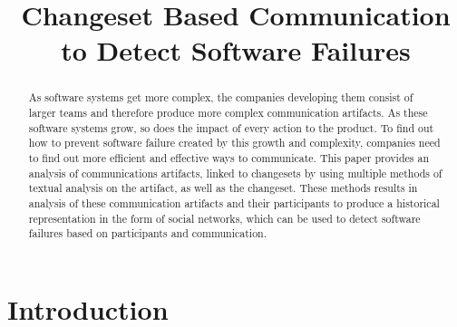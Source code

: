 \documentclass[conference]{IEEEtran}
\begin{document}
\title{Changeset Based Communication to Detect Software Failures}

\author{
}
\maketitle


\begin{abstract}
As software systems get more complex, the companies developing them consist of larger teams and therefore produce more complex communication artifacts.  As these software systems grow, so does the impact of every action to the product.  To find out how to prevent software failure created by this growth and complexity, companies need to find out more efficient and effective ways to communicate.  This paper provides an analysis of communications artifacts, linked to changesets by using multiple methods of textual analysis on the artifact, as well as the changeset.  These methods results in analysis of these communication artifacts and their participants to produce a historical representation in the form of social networks, which can be used to detect software failures based on participants and communication.
\end{abstract}

\section{Introduction}
\end{document}
